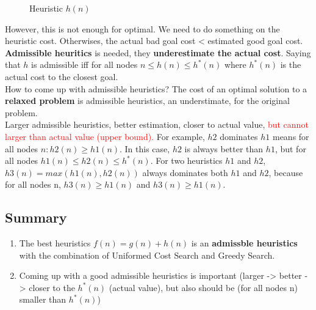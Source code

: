 \begin{figure}[htbp]
    \centering
    \caption{Heuristic $h(n)$}
    \label{greedy_search_heuristic}
\end{figure}

\noindent
However, this is not enough for optimal. We need to do something on the heuristic cost. Otherwises, the actual bad goal cost < estimated good goal cost. \textbf{Admissible heuritics} is needed, they \textbf{underestimate the actual cost}. Saying that $h$ is admissible iff for all nodes $n \le h(n) \le h^{*}(n)$ where $h^{*}(n)$ is the actual cost to the closest goal. \\
How to come up with admissible heuristics? The cost of an optimal solution to a \textbf{relaxed problem} is admissible heuristics, an understimate, for the original problem. \\
Larger admissible heuristics, better estimation, closer to actual value, \textcolor{red}{but cannot larger than actual value (upper bound).} For example, $h2$ dominates $h1$ means for all nodes $n: h2(n) \ge h1(n)$. In this case, $h2$ is always better than $h1$, but for all nodes $h1(n) \le h2(n) \le h^{*}(n)$. For two heuristics $h1$ and $h2$, $h3(n) = max(h1(n),h2(n))$ always dominates both $h1$ and $h2$, because for all nodes n, $h3(n) \ge h1(n)$ and $h3(n) \ge h1(n)$.

\subsection{Summary}
\begin{enumerate}
    \item The best heuristics $f(n) = g(n) + h(n)$ is an \textbf{admissble heuristics} with the combination of Uniformed Cost Search and Greedy Search.
    \item Coming up with a good admissible heuristics is important (larger -> better -> closer to the $h^{*}(n)$ (actual value), but also should be (for all nodes n) smaller than $h^{*}(n)$)
\end{enumerate}

\pagebreak